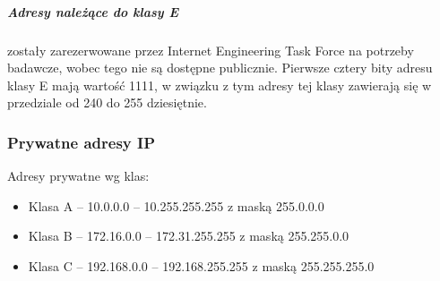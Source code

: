 \documentclass[a4paper,12pt,oneside]{book}
\begin{document}
			\subparagraph{Adresy należące do klasy E} zostały zarezerwowane przez Internet Engineering Task Force na potrzeby badawcze, wobec tego nie są dostępne publicznie. Pierwsze cztery bity adresu klasy E mają wartość 1111, w związku z tym adresy tej klasy zawierają się w przedziale od 240 do 255 dziesiętnie.
			\subsubsection{Prywatne adresy IP}
				Adresy prywatne wg klas:
				\begin{itemize}
					\item Klasa A – 10.0.0.0 – 10.255.255.255 z maską 255.0.0.0
					\item Klasa B – 172.16.0.0 – 172.31.255.255 z maską 255.255.0.0
					\item Klasa C – 192.168.0.0 – 192.168.255.255 z maską 255.255.255.0
				\end{itemize}
\end{document}
